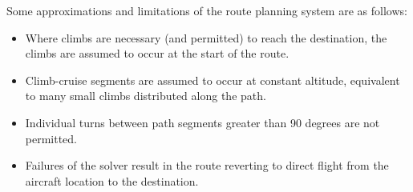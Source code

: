 Some approximations and limitations of the route planning system are as follows:
\begin{itemize}
\item Where climbs are necessary (and permitted) to reach the destination,
the climbs are assumed to occur at the start of the route.
\item Climb-cruise segments are assumed to occur at constant altitude,
equivalent to many small climbs distributed along the path.
\item Individual turns between path segments greater than 90 degrees
  are not permitted.
\item Failures of the solver result in the route reverting to direct flight
from the aircraft location to the destination.
\end{itemize}
